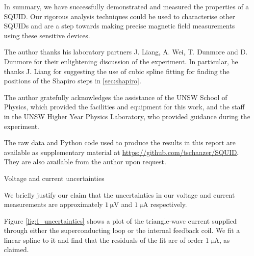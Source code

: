 \documentclass[twocol]{ametsocV6.1}
\begin{document}
In summary, we have successfully demonstrated and measured the properties
of a SQUID. Our rigorous analysis techniques could be used to characterise
other SQUIDs and are a step towards making precise magnetic field measurements
using these sensitive devices.


\acknowledgments
The author thanks his laboratory partners J. Liang, A. Wei, T. Dunmore and
D. Dunmore for their enlightening discussion of the experiment. In particular,
he thanks J. Liang for suggesting the use of cubic spline fitting
for finding the positions of the Shapiro steps in \autoref{sec:shapiro}.

The author gratefully acknowledges the assistance of the UNSW School of Physics,
which provided the facilities and equipment for this work, and the staff
in the UNSW Higher Year Physics Laboratory, who provided guidance during
the experiment.

\datastatement
The raw data and Python code used to produce the results in this report
are available as supplementary material at
\url{https://github.com/tschanzer/SQUID}. They are also available from
the author upon request.




\clearpage
\appendix
\begin{center}
	Voltage and current uncertainties
\end{center}

We briefly justify our claim that the uncertainties in our voltage and
current measurements are approximately $\SI{1}{\micro\volt}$ and
$\SI{1}{\micro\ampere}$ respectively.

Figure \ref{fig:I_uncertainties} shows a plot of the triangle-wave current
supplied through either the superconducting loop or the internal feedback
coil. We fit a linear spline to it and find that the residuals of the fit
are of order $\SI{1}{\micro\ampere}$, as claimed.
\end{document}
